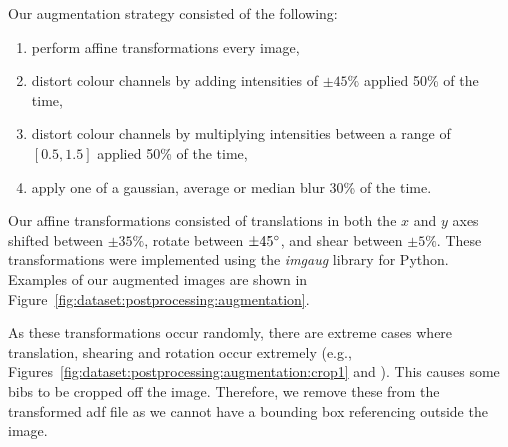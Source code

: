 Our augmentation strategy consisted of the following:

\begin{enumerate}
  \item perform affine transformations every image,
  \item distort colour channels by adding intensities of $\pm45\%$ applied 50\% of the time,
  \item distort colour channels by multiplying intensities between a range of $[0.5, 1.5]$ applied 50\% of the time,
  \item apply one of a gaussian, average or median blur 30\% of the time.
\end{enumerate}

Our affine transformations consisted of translations in both the $x$ and $y$ axes shifted between $\pm35\%$, rotate between $\pm45\degree$, and shear between $\pm5\%$. These transformations were implemented using the \textit{imgaug} library for Python. Examples of our augmented images are shown in Figure~\ref{fig:dataset:postprocessing:augmentation}.

As these transformations occur randomly, there are extreme cases where translation, shearing and rotation occur extremely (e.g., Figures~\ref{fig:dataset:postprocessing:augmentation:crop1} and ). This causes some bibs to be cropped off the image. Therefore, we remove these from the transformed \gls{adf} file as we cannot have a bounding box referencing outside the image.

